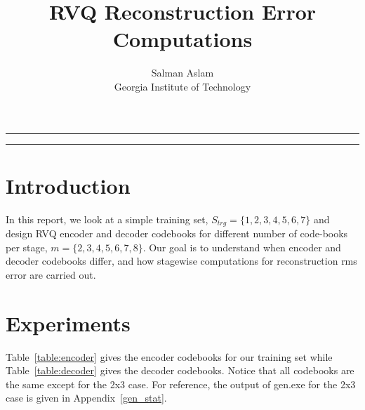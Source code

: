 
\title{RVQ Reconstruction Error Computations}
\author{Salman Aslam\\ Georgia Institute of Technology}
\date{}


\maketitle
\rule[0pt]{\textwidth}{1pt}
\tableofcontents
\rule[0pt]{\textwidth}{1pt}


\section{Introduction}
In this report, we look at a simple training set, $S_{trg}=\{1,2,3,4,5,6,7\}$ and design RVQ encoder and decoder codebooks for different number of code-books per stage, $m=\{2,3,4,5,6,7,8\}$.  Our goal is to understand when encoder and decoder codebooks differ, and how stagewise computations for reconstruction rms error are carried out.


\section{Experiments}

Table~\ref{table:encoder} gives the encoder codebooks for our training set while Table~\ref{table:decoder} gives the decoder codebooks.  Notice that all codebooks are the same except for the 2x3 case.  For reference, the output of gen.exe for the 2x3 case is given in Appendix~\ref{gen_stat}.

